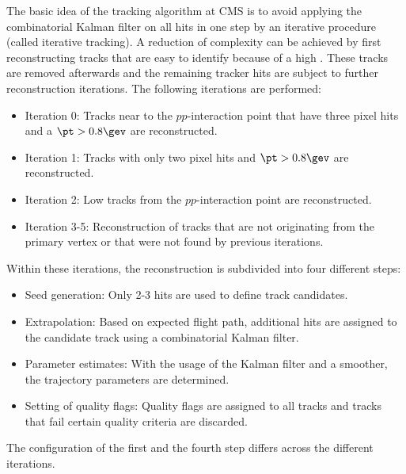 The basic idea of the tracking algorithm at CMS is to avoid applying the combinatorial Kalman filter on all hits in one step by an iterative procedure (called iterative tracking).
A reduction of complexity can be achieved by first reconstructing tracks that are easy to identify because of \eg a high \pt. 
These tracks are removed afterwards and the remaining tracker hits are subject to further reconstruction iterations.
The following iterations are performed:
\begin{itemize}
\item Iteration 0: Tracks near to the $pp$-interaction point that have three pixel hits and a $\pt>0.8\gev$ are reconstructed.
\item Iteration 1: Tracks with only two pixel hits and $\pt>0.8\gev$ are reconstructed. 
\item Iteration 2: Low \pt tracks from the $pp$-interaction point are reconstructed.
\item Iteration 3-5: Reconstruction of tracks that are not originating from the primary vertex or that were not found by previous iterations.
\end{itemize}
Within these iterations, the reconstruction is subdivided into four different steps:
\begin{itemize}
\item Seed generation: Only 2-3 hits are used to define track candidates.
\item Extrapolation: Based on expected flight path, additional hits are assigned to the candidate track using a combinatorial Kalman filter.
\item Parameter estimates: With the usage of the Kalman filter and a smoother, the trajectory parameters are determined.
\item Setting of quality flags: Quality flags are assigned to all tracks and tracks that fail certain quality criteria are discarded.
\end{itemize}
The configuration of the first and the fourth step differs across the different iterations.  

